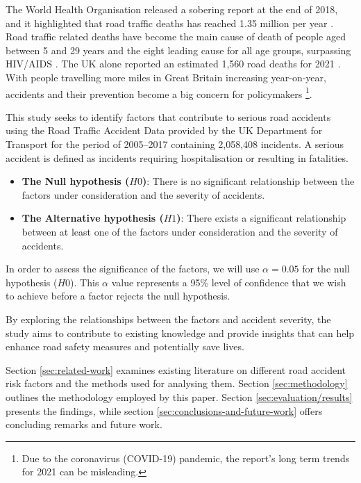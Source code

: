 The World Health Organisation released a sobering report at the end of 2018, and it highlighted that road traffic deaths has reached 1.35 million per year \cite{who2018}.
Road traffic related deaths have become the main cause of death of people aged between 5 and 29 years and the eight leading cause for all age groups, surpassing HIV/AIDS \cite{who2018}.
The UK alone reported an estimated 1,560 road deaths for 2021 \cite{GBRTE2021}.
With people travelling more miles in Great Britain increasing year-on-year, accidents and their prevention become a big concern for policymakers \cite{GBRTE2021}\footnote{Due to the coronavirus (COVID-19) pandemic, the report's long term trends for 2021 can be misleading.}.

This study seeks to identify factors that contribute to serious road accidents using the Road Traffic Accident Data \cite{RTAD2023} provided by the UK Department for Transport for the period of 2005--2017 containing 2,058,408 incidents.
A serious accident is defined as incidents requiring hospitalisation or resulting in fatalities.

\begin{itemize}
    \item \textbf{The Null hypothesis ($H0$)}: There is no significant relationship between the factors under consideration and the severity of accidents.
    \item \textbf{The Alternative hypothesis ($H1$)}: There exists a significant relationship between at least one of the factors under consideration and the severity of accidents.
\end{itemize}

In order to assess the significance of the factors, we will use $\alpha=0.05$ for the null hypothesis ($H0$).
This $\alpha$ value represents a 95\% level of confidence that we wish to achieve before a factor rejects the null hypothesis.

By exploring the relationships between the factors and accident severity, the study aims to contribute to existing knowledge and provide insights that can help enhance road safety measures and potentially save lives.

Section \ref{sec:related-work} examines existing literature on different road accident risk factors and the methods used for analysing them.
Section \ref{sec:methodology} outlines the methodology employed by this paper.
Section \ref{sec:evaluation/results} presents the findings, while section \ref{sec:conclusions-and-future-work} offers concluding remarks and future work.
